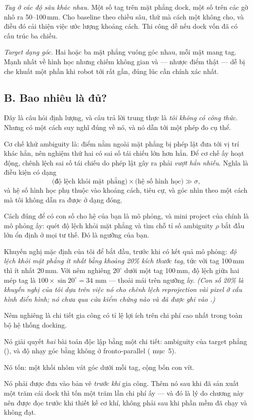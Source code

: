 \documentclass[../../marker.tex]{subfiles}
\begin{document}
\emph{Tag ở các độ sâu khác nhau.} Một số tag trên mặt phẳng dock, một số trên các gờ nhô ra 50--100\,mm. Cho baseline theo chiều sâu, thứ mà cách một không cho, và điều đó cải thiện việc ước lượng khoảng cách. Thi công dễ nếu dock vốn đã có cấu trúc ba chiều.

\emph{Target dạng góc.} Hai hoặc ba mặt phẳng vuông góc nhau, mỗi mặt mang tag. Mạnh nhất về hình học nhưng chiếm không gian và --- nhược điểm thật --- dễ bị che khuất một phần khi robot tới rất gần, đúng lúc cần chính xác nhất.

\subsection{B. Bao nhiêu là đủ?}

Đây là câu hỏi định lượng, và câu trả lời trung thực là \emph{tôi không có công thức}. Nhưng có một cách suy nghĩ đúng về nó, và nó dẫn tới một phép đo cụ thể.

Cơ chế khử ambiguity là: điểm nằm ngoài mặt phẳng bị phép lật đưa tới vị trí khác hẳn, nên nghiệm thứ hai có sai số tái chiếu lớn hơn hẳn. Để cơ chế ấy hoạt động, chênh lệch sai số tái chiếu do phép lật gây ra phải \emph{vượt hẳn nhiễu}. Nghĩa là điều kiện có dạng
\[
\text{(độ lệch khỏi mặt phẳng)} \times \text{(hệ số hình học)} \gg \sigma,
\]
và hệ số hình học phụ thuộc vào khoảng cách, tiêu cự, và góc nhìn theo một cách mà tôi không dẫn ra được ở dạng đóng.

Cách đúng để có con số cho hệ của bạn là mô phỏng, và mini project của  chính là mô phỏng ấy: quét độ lệch khỏi mặt phẳng và tìm chỗ tỉ số ambiguity \(\rho\) bắt đầu lớn ổn định ở mọi tư thế. Đó là ngưỡng của bạn.

Khuyến nghị mặc định của tôi để bắt đầu, trước khi có kết quả mô phỏng: \emph{độ lệch khỏi mặt phẳng ít nhất bằng khoảng 20\% kích thước tag}, tức với tag 100\,mm thì ít nhất 20\,mm. Với nêm nghiêng \(20^\circ\) dưới một tag 100\,mm, độ lệch giữa hai mép tag là \(100 \times \sin 20^\circ = 34\) mm --- thoải mái trên ngưỡng ấy. \emph{(Con số 20\% là khuyến nghị của tôi dựa trên việc nó cho chênh lệch reprojection vài pixel ở cấu hình điển hình; nó chưa qua cửa kiểm chứng nào và đã được ghi vào .)}

\begin{cannho}
Nêm nghiêng là chi tiết gia công có tỉ lệ lợi ích trên chi phí cao nhất trong toàn bộ hệ thống docking.

Nó giải quyết \emph{hai} bài toán độc lập bằng một chi tiết: ambiguity của target phẳng (), và độ nhạy góc bằng không ở fronto-parallel ( mục~5).

Nó tốn: một khối nhôm vát góc dưới mỗi tag, cộng bốn con vít.

Nó phải được đưa vào bản vẽ \emph{trước khi} gia công. Thêm nó sau khi đã sản xuất một trăm cái dock thì tốn một trăm lần chi phí ấy --- và đó là lý do chương này nên được đọc trước khi thiết kế cơ khí, không phải sau khi phần mềm đã chạy và không đạt.
\end{cannho}
\end{document}
